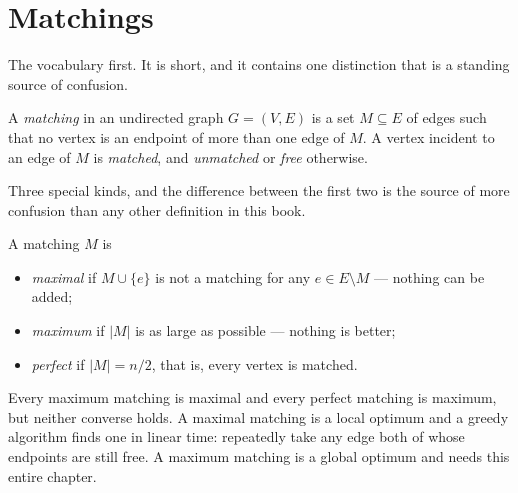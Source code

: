 \section{Matchings}
\label{sec:matching-basics}

The vocabulary first. It is short, and it contains one distinction that is a
standing source of confusion.

\begin{definition}[Matching]
A \emph{matching} in an undirected graph $G = (V,E)$ is a set $M \subseteq E$
of edges such that no vertex is an endpoint of more than one edge of $M$. A
vertex incident to an edge of $M$ is \emph{matched}, and \emph{unmatched} or
\emph{free} otherwise.
\end{definition}

Three special kinds, and the difference between the first two is the source of
more confusion than any other definition in this book.

\begin{definition}
A matching $M$ is
\begin{itemize}[nosep]
  \item \emph{maximal} if $M \cup \{e\}$ is not a matching for any
        $e \in E \setminus M$ --- nothing can be added;
  \item \emph{maximum} if $|M|$ is as large as possible --- nothing is better;
  \item \emph{perfect} if $|M| = n/2$, that is, every vertex is matched.
\end{itemize}
\end{definition}

Every maximum matching is maximal and every perfect matching is maximum, but
neither converse holds. A maximal matching is a local optimum and a greedy
algorithm finds one in linear time: repeatedly take any edge both of whose
endpoints are still free. A maximum matching is a global optimum and needs this
entire chapter.

